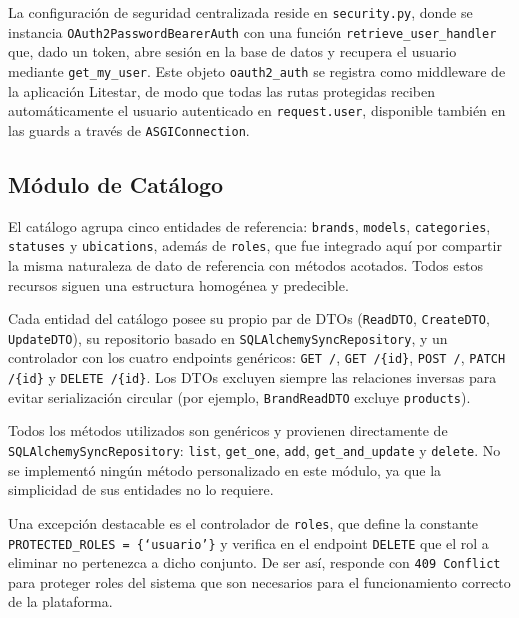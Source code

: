 La configuración de seguridad centralizada reside en \texttt{security.py}, donde se instancia \texttt{OAuth2PasswordBearerAuth} con una función \texttt{retrieve\_user\_handler} que, dado un token, abre sesión en la base de datos y recupera el usuario mediante \texttt{get\_my\_user}. Este objeto \texttt{oauth2\_auth} se registra como middleware de la aplicación Litestar, de modo que todas las rutas protegidas reciben automáticamente el usuario autenticado en \texttt{request.user}, disponible también en las guards a través de \texttt{ASGIConnection}.

\subsection{Módulo de Catálogo}\label{sec:backend_catalogo}

El catálogo agrupa cinco entidades de referencia: \texttt{brands}, \texttt{models}, \texttt{categories}, \texttt{statuses} y \texttt{ubications}, además de \texttt{roles}, que fue integrado aquí por compartir la misma naturaleza de dato de referencia con métodos acotados. Todos estos recursos siguen una estructura homogénea y predecible.

Cada entidad del catálogo posee su propio par de DTOs (\texttt{ReadDTO}, \texttt{CreateDTO}, \texttt{UpdateDTO}), su repositorio basado en \texttt{SQLAlchemySyncRepository}, y un controlador con los cuatro endpoints genéricos: \texttt{GET /}, \texttt{GET /\{id\}}, \texttt{POST /}, \texttt{PATCH /\{id\}} y \texttt{DELETE /\{id\}}. Los DTOs excluyen siempre las relaciones inversas para evitar serialización circular (por ejemplo, \texttt{BrandReadDTO} excluye \texttt{products}).

Todos los métodos utilizados son genéricos y provienen directamente de \texttt{SQLAlchemySyncRepository}: \texttt{list}, \texttt{get\_one}, \texttt{add}, \texttt{get\_and\_update} y \texttt{delete}. No se implementó ningún método personalizado en este módulo, ya que la simplicidad de sus entidades no lo requiere.

Una excepción destacable es el controlador de \texttt{roles}, que define la constante \texttt{PROTECTED\_ROLES = \{`usuario'\}}  y verifica en el endpoint \texttt{DELETE} que el rol a eliminar no pertenezca a dicho conjunto. De ser así, responde con \texttt{409 Conflict} para proteger roles del sistema que son necesarios para el funcionamiento correcto de la plataforma.

